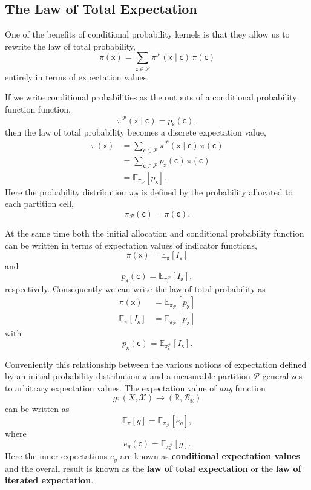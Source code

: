 \documentclass[
  letterpaper,
  DIV=11,
  numbers=noendperiod]{scrartcl}
\begin{document}
\subsection{The Law of Total
Expectation}\label{the-law-of-total-expectation}

One of the benefits of conditional probability kernels is that they
allow us to rewrite the law of total probability, \[
\pi( \mathsf{x} )
=
\sum_{ \mathsf{c} \in \mathcal{P} }
\pi^{\mathcal{P}}( \mathsf{x} \mid \mathsf{c} ) \, \pi( \mathsf{c} )
\] entirely in terms of expectation values.

If we write conditional probabilities as the outputs of a conditional
probability function function, \[
\pi^{\mathcal{P}}( \mathsf{x} \mid \mathsf{c} )
=
p_{\mathsf{x}}( \mathsf{c} ),
\] then the law of total probability becomes a discrete expectation
value, \begin{align*}
\pi( \mathsf{x} )
&=
\sum_{ \mathsf{c} \in \mathcal{P} }
\pi^{\mathcal{P}}( \mathsf{x} \mid \mathsf{c} ) \, \pi( \mathsf{c} )
\\
&=
\sum_{ \mathsf{c} \in \mathcal{P} }
p_{\mathsf{x}}( \mathsf{c} ) \, \pi( \mathsf{c} )
\\
&=
\mathbb{E}_{ \pi_{\mathcal{P}} } [ p_{\mathsf{x}} ].
\end{align*} Here the probability distribution \(\pi_{\mathcal{P}}\) is
defined by the probability allocated to each partition cell, \[
\pi_{\mathcal{P}}( \mathsf{c} ) = \pi( \mathsf{c} ).
\]

At the same time both the initial allocation and conditional probability
function can be written in terms of expectation values of indicator
functions, \[
\pi( \mathsf{x} )
=
\mathbb{E}_{\pi}[ I_{\mathsf{x}} ]
\] and \[
p_{\mathsf{x}}(\mathsf{c})
=
\mathbb{E}_{\pi^{\mathcal{P}}_{\mathsf{c}} }[ I_{\mathsf{x}} ],
\] respectively. Consequently we can write the law of total probability
as \begin{align*}
\pi( \mathsf{x} )
&=
\mathbb{E}_{ \pi_{\mathcal{P}} } [ p_{\mathsf{x}} ]
\\
\mathbb{E}_{\pi}[ I_{\mathsf{x}} ]
&=
\mathbb{E}_{ \pi_{\mathcal{P}} } [ p_{\mathsf{x}} ]
\end{align*} with \[
p_{\mathsf{x}}(\mathsf{c})
=
\mathbb{E}_{\pi^{\mathcal{P}}_{\mathsf{c}} }[ I_{\mathsf{x}} ].
\]

Conveniently this relationship between the various notions of
expectation defined by an initial probability distribution \(\pi\) and a
measurable partition \(\mathcal{P}\) generalizes to arbitrary
expectation values. The expectation value of \emph{any} function \[
g : (X, \mathcal{X}) \rightarrow
    (\mathbb{R}, \mathcal{B}_{\mathbb{R}})
\] can be written as \[
\mathbb{E}_{\pi}[ g ]
=
\mathbb{E}_{ \pi_{\mathcal{P}} } [ e_{g} ],
\] where \[
e_{g}(\mathsf{c})
=
\mathbb{E}_{ \pi^{\mathcal{P}}_{\mathsf{c}} }[ g ].
\] Here the inner expectations \(e_{g}\) are known as
\textbf{conditional expectation values} and the overall result is known
as the \textbf{law of total expectation} or the \textbf{law of iterated
expectation}.
\end{document}
